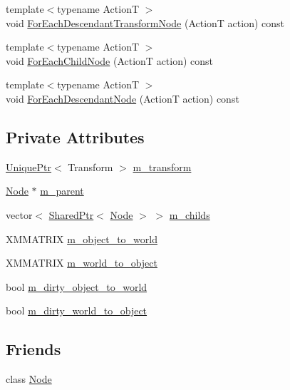 \begin{DoxyCompactItemize}
{\footnotesize template$<$typename ActionT $>$ }\\void \hyperlink{classmage_1_1_transform_node_a7a052715d9591defa06e494017539711}{For\+Each\+Descendant\+Transform\+Node} (ActionT action) const
\item 
{\footnotesize template$<$typename ActionT $>$ }\\void \hyperlink{classmage_1_1_transform_node_a3dd36b373d27e3526df562ba899f721f}{For\+Each\+Child\+Node} (ActionT action) const
\item 
{\footnotesize template$<$typename ActionT $>$ }\\void \hyperlink{classmage_1_1_transform_node_a696d23bd936d3c3f880cb8b5cfd54d80}{For\+Each\+Descendant\+Node} (ActionT action) const
\end{DoxyCompactItemize}
\subsection*{Private Attributes}
\begin{DoxyCompactItemize}
\item 
\hyperlink{namespacemage_a8c307fbcc33bce9b7f2aa4c26c3b95cf}{Unique\+Ptr}$<$ Transform $>$ \hyperlink{classmage_1_1_transform_node_ac601e39377f706442da334e040adaab3}{m\+\_\+transform}
\item 
\hyperlink{classmage_1_1_node}{Node} $\ast$ \hyperlink{classmage_1_1_transform_node_afad4b8198a5e4b1a3c46fb8e51fd17c2}{m\+\_\+parent}
\item 
vector$<$ \hyperlink{namespacemage_a1e01ae66713838a7a67d30e44c67703e}{Shared\+Ptr}$<$ \hyperlink{classmage_1_1_node}{Node} $>$ $>$ \hyperlink{classmage_1_1_transform_node_ae26b5d4c920a3743354b6f28c8b41651}{m\+\_\+childs}
\item 
X\+M\+M\+A\+T\+R\+IX \hyperlink{classmage_1_1_transform_node_a79de447d6d40226d7ceb276007f5fbeb}{m\+\_\+object\+\_\+to\+\_\+world}
\item 
X\+M\+M\+A\+T\+R\+IX \hyperlink{classmage_1_1_transform_node_ade413fc9a980ce8e1191c17f94f25e3f}{m\+\_\+world\+\_\+to\+\_\+object}
\item 
bool \hyperlink{classmage_1_1_transform_node_a389151fddc72499d0be4e725622d99b9}{m\+\_\+dirty\+\_\+object\+\_\+to\+\_\+world}
\item 
bool \hyperlink{classmage_1_1_transform_node_acb9046e0096ada337e1978f016daa144}{m\+\_\+dirty\+\_\+world\+\_\+to\+\_\+object}
\end{DoxyCompactItemize}
\subsection*{Friends}
\begin{DoxyCompactItemize}
\item 
class \hyperlink{classmage_1_1_transform_node_a6db9d28bd448a131448276ee03de1e6d}{Node}
\end{DoxyCompactItemize}


